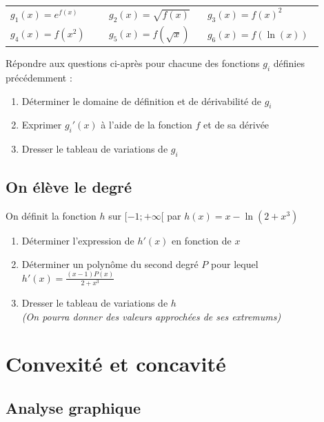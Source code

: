 \documentclass[oneside,12pt]{article}          %
\begin{document}
\renewcommand{\arraystretch}{1.5}
\begin{tabular}{p{0.3\linewidth} p{0.3\linewidth} p{0.3\linewidth}}
	$g_1(x)=e^{f(x)}$ & $g_2(x)=\sqrt{f(x)}$ & $g_3(x)=f(x)^2$ \\
	$g_4(x)=f\left(x^2\right)$ & $g_5(x)=f\left(\sqrt{x}\right)$ & $g_6(x)=f\left(\ln(x)\right)$ 
\end{tabular}

Répondre aux questions ci-après pour chacune des fonctions $g_i$ définies précédemment :
\begin{enumerate}
	\item Déterminer le domaine de définition et de dérivabilité de $g_i$
	\item Exprimer $g_i'(x)$ à l'aide de la fonction $f$ et de sa dérivée
	\item Dresser le tableau de variations de $g_i$
\end{enumerate}



\subsection{On élève le degré}
On définit la fonction $h$ sur $[-1;+\infty[$ par $h(x)=x-\ln\left(2+x^3\right)$
\begin{enumerate}
	\item Déterminer l'expression de $h'(x)$ en fonction de $x$
	\item Déterminer un polynôme du second degré $P$ pour lequel $h'(x)=\frac{(x-1)P(x)}{2+x^3}$
	\item Dresser le tableau de variations de $h$ \\
	\textit{(On pourra donner des valeurs approchées de ses extremums)}
\end{enumerate}




\section{Convexité et concavité}

\subsection{Analyse graphique}
\end{document}
